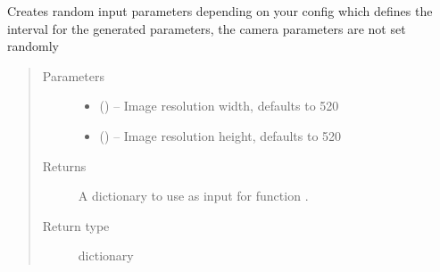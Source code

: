 \documentclass[letterpaper,10pt,english]{sphinxmanual}
\begin{document}
\begin{fulllineitems}
\begin{fulllineitems}
\end{fulllineitems}


\begin{fulllineitems}
\label{\detokenize{index:dataset.dataset_cuboids.create_random_parameters}}
Creates random input parameters depending on your config which defines the interval for the generated parameters, the camera parameters are not set randomly
\begin{quote}\begin{description}
\item[{Parameters}] \leavevmode\begin{itemize}
\item {} 
 (\sphinxstyleliteralemphasis{\sphinxupquote{, }}) -- Image resolution width, defaults to 520

\item {} 
 (\sphinxstyleliteralemphasis{\sphinxupquote{, }}) -- Image resolution height, defaults to 520

\end{itemize}

\item[{Returns}] \leavevmode
A dictionary to use as input for function {\hyperref[\detokenize{index:dataset.dataset_cuboids.create_json_string_from_parameters}]{}}.

\item[{Return type}] \leavevmode
dictionary

\end{description}\end{quote}

\end{fulllineitems}



\end{fulllineitems}
\end{document}

